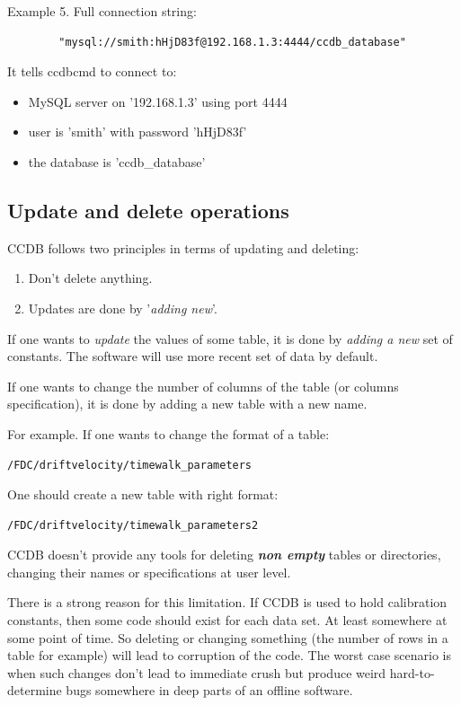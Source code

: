 \documentclass{article}
\begin{document}
Example 5. Full connection string:
\begin{verbatim}	
        "mysql://smith:hHjD83f@192.168.1.3:4444/ccdb_database"
\end{verbatim}

It tells ccdbcmd to connect to:
\begin{itemize}
  \item MySQL server  on '192.168.1.3' using port 4444
  \item user is 'smith' with password 'hHjD83f'
  \item the database is 'ccdb\_database'
\end{itemize}


\subsection{Update and delete operations}

CCDB follows two principles in terms of updating and deleting:
\begin{enumerate}
\item Don't delete anything.
\item Updates are done by '\textit{adding new}'.
\end{enumerate}

If one wants to \textit{update} the values of some table, it is done by 
\textit{adding a new} set of constants. The software will use more recent set 
of data by default. 

If one wants to change the number of columns of the table (or columns 
specification), it is done by adding a new table with a new name. 

For example. If one wants to change the format of a table:
\begin{verbatim}
/FDC/driftvelocity/timewalk_parameters
\end{verbatim}
One should create a new table with right format:
\begin{verbatim}
/FDC/driftvelocity/timewalk_parameters2
\end{verbatim}

CCDB doesn't provide any tools for deleting \textbf{\textit{non empty}} tables 
or directories, changing their names or specifications at user level. 

There is a strong reason for this limitation. 
If CCDB is used to hold calibration constants, then some code should exist for 
each data set. At least somewhere at some point of time. So deleting  
or changing something (the number of rows in a table for example) will lead to 
corruption of the code. The worst case scenario is when such changes don't
lead to immediate crush but produce weird hard-to-determine bugs somewhere in 
deep parts of an offline software.
\end{document}
